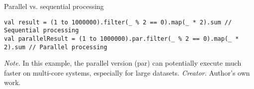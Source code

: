\begin{table}[h!]
\caption{Parallel vs. sequential processing}
\begin{lstlisting}
val result = (1 to 1000000).filter(_ % 2 == 0).map(_ * 2).sum // Sequential processing
val parallelResult = (1 to 1000000).par.filter(_ % 2 == 0).map(_ * 2).sum // Parallel processing
\end{lstlisting}
\small
\textit{Note.} In this example, the parallel version (par) can potentially execute much faster on multi-core systems, especially for large datasets.
\textit{Creator.} Author's own work.
\end{table}